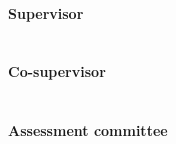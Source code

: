 \clearpage
\thispagestyle{empty}
\noindent
\\
\textbf{Supervisor}\\
\\%

\noindent
\\
\textbf{Co-supervisor}\\
\\%

\noindent
\\
\textbf{Assessment committee}\\
\\%
\\%

\clearpage
\normalsize
